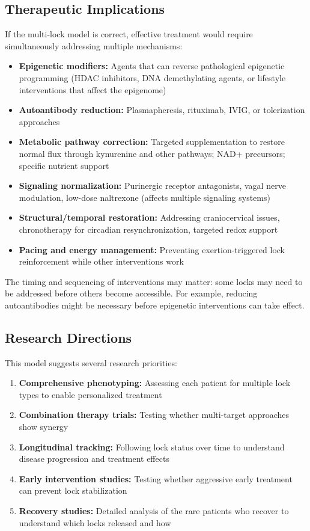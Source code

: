 \subsection{Therapeutic Implications}

If the multi-lock model is correct, effective treatment would require simultaneously addressing multiple mechanisms:

\begin{itemize}
    \item \textbf{Epigenetic modifiers:} Agents that can reverse pathological epigenetic programming (HDAC inhibitors, DNA demethylating agents, or lifestyle interventions that affect the epigenome)
    \item \textbf{Autoantibody reduction:} Plasmapheresis, rituximab, IVIG, or tolerization approaches
    \item \textbf{Metabolic pathway correction:} Targeted supplementation to restore normal flux through kynurenine and other pathways; NAD+ precursors; specific nutrient support
    \item \textbf{Signaling normalization:} Purinergic receptor antagonists, vagal nerve modulation, low-dose naltrexone (affects multiple signaling systems)
    \item \textbf{Structural/temporal restoration:} Addressing craniocervical issues, chronotherapy for circadian resynchronization, targeted redox support
    \item \textbf{Pacing and energy management:} Preventing exertion-triggered lock reinforcement while other interventions work
\end{itemize}

The timing and sequencing of interventions may matter: some locks may need to be addressed before others become accessible. For example, reducing autoantibodies might be necessary before epigenetic interventions can take effect.

\subsection{Research Directions}

This model suggests several research priorities:

\begin{enumerate}
    \item \textbf{Comprehensive phenotyping:} Assessing each patient for multiple lock types to enable personalized treatment
    \item \textbf{Combination therapy trials:} Testing whether multi-target approaches show synergy
    \item \textbf{Longitudinal tracking:} Following lock status over time to understand disease progression and treatment effects
    \item \textbf{Early intervention studies:} Testing whether aggressive early treatment can prevent lock stabilization
    \item \textbf{Recovery studies:} Detailed analysis of the rare patients who recover to understand which locks released and how
\end{enumerate}



